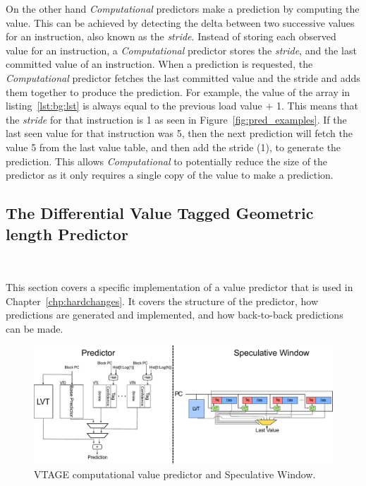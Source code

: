On the other hand \textit{Computational} predictors make a prediction by computing the value.
This can be achieved by detecting the delta between two successive values for an instruction, also known as the \textit{stride}.
Instead of storing each observed value for an instruction, a \textit{Computational} predictor stores the \textit{stride}, and the last committed value of an instruction.
When a prediction is requested, the \textit{Computational} predictor fetches the last committed value and the stride and adds them together to produce the prediction.
For example, the value of the array in listing~\ref{lst:bg:lst} is always equal to the previous load value $+$ 1.
This means that the \textit{stride} for that instruction is 1 as seen in Figure~\ref{fig:pred_examples}.
If the last seen value for that instruction was 5, then the next prediction will fetch the value 5 from the last value table, and then add the stride (1), to generate the prediction.
This allows \textit{Computational} to potentially reduce the size of the predictor as it only requires a single copy of the value to make a prediction. 


\subsection{The Differential Value Tagged Geometric length Predictor}~\label{chp:bck:vtage}

This section covers a specific implementation of a value predictor that is used in Chapter~\ref{chp:hardchanges}.
It covers the structure of the predictor, how predictions are generated and implemented, and how back-to-back predictions can be made.

\begin{figure}[t]
    \centering
    \includegraphics[width=1\textwidth]{background/graphics/valuepred.pdf}
	\vspace{-3em}
    \caption{VTAGE computational value predictor and Speculative Window.}
    \label{fig:stride_over}
	\vspace{-1em}
\end{figure}

